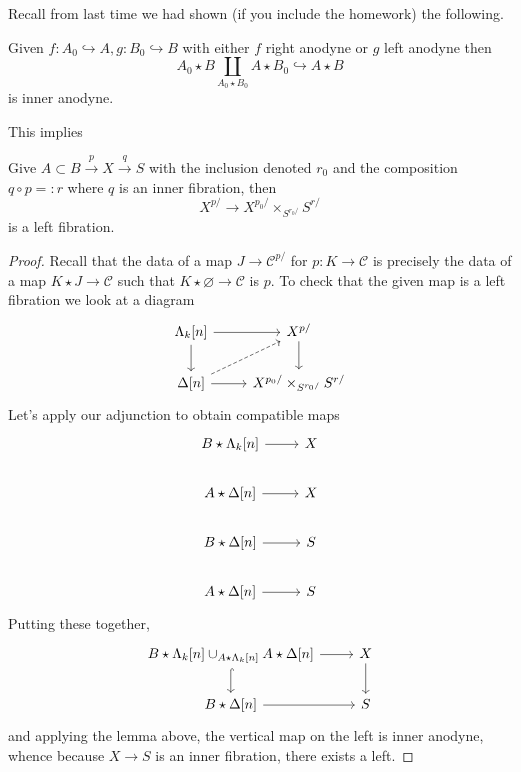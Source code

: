 \documentclass{amsart}
\begin{document}
Recall from last time we had shown (if you include the homework) the following.
\begin{lemma}[HTT 2.1.2.3]
    Given $f:A_0\hookrightarrow A, g:B_0\hookrightarrow B$ with either $f$ right anodyne
    or $g$ left anodyne then
    \begin{equation*}
        A_0\star B\coprod_{A_0\star B_0}A\star B_0 \hookrightarrow A\star B
    \end{equation*}
    is inner anodyne.
\end{lemma}

This implies
\begin{proposition}[HTT 2.1]
    Give $A\subset B\xrightarrow{p} X\xrightarrow{q} S$ with the inclusion denoted $r_0$
    and the composition $q\circ p =: r$ where $q$ is an inner fibration, then 
    \begin{equation*}
        X^{p/} \to X^{p_0/}\times_{S^{r_0/}} S^{r/}
    \end{equation*}
    is a left fibration.
\end{proposition}
\begin{proof}
    Recall that the data of a map $J\to \mathcal{C}^{p/}$ for $p:K\to\mathcal{C}$ is precisely the data of
    a map $K\star J\to \mathcal{C}$ such that $K\star\varnothing\to \mathcal{C}$ is $p$.
    To check that the given map is a left fibration we look at a diagram
    \begin{equation*}
        \begin{tikzcd}
            \Lambda_k[n]\dar \rar & X^{p/}\dar\\
            \Delta[n] \rar\ar[ur,dashed] & X^{p_0/}\times_{S^{r_0/}}S^{r/}
        \end{tikzcd}
    \end{equation*}
    Let's apply our adjunction to obtain compatible maps
    \begin{equation*}
        \begin{tikzcd}
            B\star\Lambda_k[n] \rar & X \\
            A\star \Delta[n] \rar & X \\
            B\star \Delta[n] \rar & S \\
            A\star \Delta[n] \rar & S
        \end{tikzcd}
    \end{equation*}
    Putting these together,
    \begin{equation*}
        \begin{tikzcd}
            B\star \Lambda_k[n] \cup_{A\star \Lambda_k[n]} A\star \Delta[n] \rar\ar[d,hook] & X \dar\\
            B\star \Delta[n] \rar & S
        \end{tikzcd}
    \end{equation*}
    and applying the lemma above, the vertical map on the left is inner anodyne, whence
    because $X\to S$ is an inner fibration, there exists a left.
\end{proof}
\end{document}
